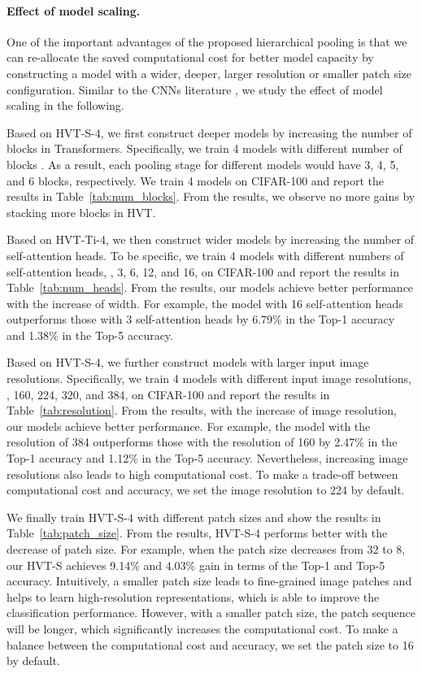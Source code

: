 \paragraph{Effect of model scaling.}
\label{sec:model_scaling}
One of the important advantages of the proposed hierarchical pooling is that we can re-allocate the saved computational cost for better model capacity by constructing a model with a wider, deeper, larger resolution or smaller patch size configuration.
Similar to the CNNs literature \cite{resnet,wider_deeper,wrn}, we study the effect of model scaling in the following.

Based on HVT-S-4, we first construct deeper models by increasing the number of blocks in Transformers. Specifically, we train 4 models with different number of blocks . As a result, each pooling stage for different models would have 3, 4, 5, and 6 blocks, respectively. We train 4 models on CIFAR-100 and report the results in Table~\ref{tab:num_blocks}. From the results, we observe no more gains by stacking more blocks in HVT. 

Based on HVT-Ti-4, we then construct wider models by increasing the number of self-attention heads. To be specific, we train 4 models with different numbers of self-attention heads, \ie, 3, 6, 12, and 16, on CIFAR-100 and report the results in Table~\ref{tab:num_heads}. From the results, our models achieve better performance with the increase of width. For example, the model with 16 self-attention heads outperforms those with 3 self-attention heads by 6.79\% in the Top-1 accuracy and 1.38\% in the Top-5 accuracy.

Based on HVT-S-4, we further construct models with larger input image resolutions. Specifically, we train 4 models with different input image resolutions, \ie, 160, 224, 320, and 384, on CIFAR-100 and report the results in Table~\ref{tab:resolution}. From the results, with the increase of image resolution, our models achieve better performance. For example, the model with the resolution of 384 outperforms those with the resolution of 160 by 2.47\% in the Top-1 accuracy and 1.12\% in the Top-5 accuracy. Nevertheless, increasing image resolutions also leads to high computational cost. To make a trade-off between computational cost and accuracy, we set the image resolution to 224 by default.

We finally train HVT-S-4 with different patch sizes  and show the results in Table~\ref{tab:patch_size}. From the results, HVT-S-4 performs better with the decrease of patch size. 
For example, when the patch size decreases from 32 to 8, our HVT-S achieves 9.14\% and 4.03\% gain in terms of the Top-1 and Top-5 accuracy. Intuitively, a smaller patch size leads to fine-grained image patches and helps to learn high-resolution representations, which is able to improve the classification performance. However, with a smaller patch size, the patch sequence will be longer, which significantly increases the computational cost. To make a balance between the computational cost and accuracy, we set the patch size to 16 by default.


